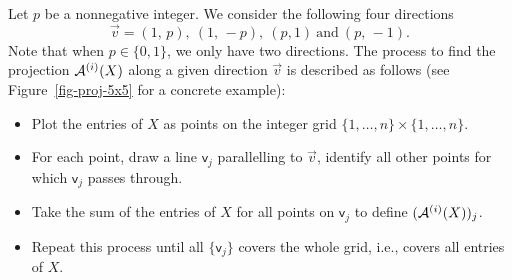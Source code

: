 \documentclass[10pt]{article}
\newcommand{\cA}{{\cal A}}
\begin{document}
\begin{appendices}
Let $p$ be a nonnegative integer. We consider the following four directions
\begin{equation*}
\vec{v} = (1,\,p), ~(1,\,-p), ~(p,1) ~\textrm{and} ~(p,\,-1).
\end{equation*}
Note that when $p\in\{0, 1\}$, we only have two directions. The process to find the projection \(\cA^{(i)}(X) \) along a given direction \(\vec{v}\) is described as follows (see Figure~\ref{fig-proj-5x5} for a concrete example):
\begin{itemize}[leftmargin=0.8cm]
\item[1.] Plot the entries of $X$ as points on the integer grid $\{1,\ldots,n\}\times \{1,\ldots,n\}$.
\item[2.] For each point, draw a line $\mathsf{v}_j$ parallelling to $\vec{v}$, identify all other points for which $\mathsf{v}_j$ passes through.
\item[3.] Take the sum of the entries of $X$ for all points on $\mathsf{v}_j$ to define $(\cA^{(i)}(X))_j$.
\item[4.] Repeat this process until all $\{\mathsf{v}_j\}$ covers the whole grid, i.e., covers all entries of $X$.
\end{itemize}



\end{appendices}
\end{document}
